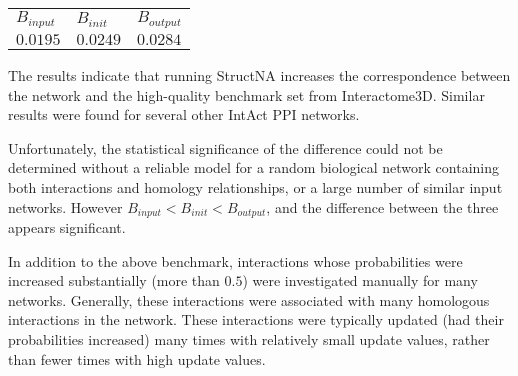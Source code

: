 \documentclass[12pt,twoside]{article}
\begin{document}
\begin{tabular}{lll}
$B_{input}$ & $B_{init}$ & $B_{output}$ \\
$0.0195$ & $0.0249$ & $0.0284$
\end{tabular}

The results indicate that running StructNA increases the correspondence between the network and the high-quality benchmark set from Interactome3D. Similar results were found for several other IntAct PPI networks.

Unfortunately, the statistical significance of the difference could not be determined without a reliable model for a random biological network containing both interactions and homology relationships, or a large number of similar input networks. However $B_{input} < B_{init} < B_{output}$, and the difference between the three appears significant.

In addition to the above benchmark, interactions whose probabilities were increased substantially (more than $0.5$) were investigated manually for many networks. Generally, these interactions were associated with many homologous interactions in the network. These interactions were typically updated (had their probabilities increased) many times with relatively small update values, rather than fewer times with high update values.



\end{document}
